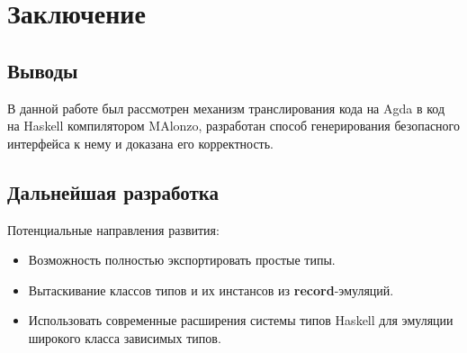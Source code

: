 \section{Заключение}

\subsection{Выводы}

В данной работе был рассмотрен механизм транслирования кода на Agda в код на Haskell
компилятором MAlonzo, разработан способ генерирования безопасного интерфейса к нему и
доказана его корректность.

\subsection{Дальнейшая разработка}

Потенциальные направления развития:

\begin{itemize}
\item Возможность полностью экспортировать простые типы.
\item Вытаскивание классов типов и их инстансов из \textbf{record}-эмуляций.
\item Использовать современные расширения системы типов Haskell для эмуляции
      широкого класса зависимых типов.
\end{itemize}

